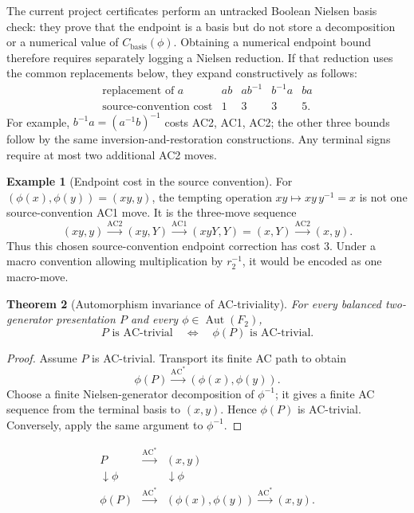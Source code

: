 \documentclass[11pt]{article}
\newtheorem{theorem}{Theorem}[section]
\theoremstyle{definition}
\newtheorem{example}[theorem]{Example}
\theoremstyle{remark}
\newcommand{\F}{F_2}
\newcommand{\Aut}{\operatorname{Aut}}
\newcommand{\AC}{\mathrm{AC}}
\begin{document}
The current project certificates perform an untracked Boolean Nielsen basis
check: they prove that the endpoint is a basis but do not store a
decomposition or a numerical value of \(C_{\mathrm{basis}}(\phi)\).
Obtaining a numerical endpoint bound therefore requires separately logging
a Nielsen reduction.  If that reduction uses the common replacements below,
they expand constructively as follows:
\[
\begin{array}{c|cccc}
\text{replacement of }a&
a b&a b^{-1}&b^{-1}a&b a\\
\hline
\text{source-convention cost}&1&3&3&5.
\end{array}
\]
For example, \(b^{-1}a=(a^{-1}b)^{-1}\) costs AC2, AC1, AC2; the other
three bounds follow by the same inversion-and-restoration constructions.
Any terminal signs require at most two additional AC2 moves.

\begin{example}[Endpoint cost in the source convention]
For \((\phi(x),\phi(y))=(xy,y)\), the tempting operation
\(xy\mapsto xy\,y^{-1}=x\) is not one source-convention AC1 move.  It is
the three-move sequence
\[
(xy,y)\xrightarrow{\AC2}(xy,Y)
\xrightarrow{\AC1}(xyY,Y)=(x,Y)
\xrightarrow{\AC2}(x,y).
\]
Thus this chosen source-convention endpoint correction has cost \(3\).
Under a macro convention allowing multiplication by \(r_2^{-1}\), it would
be encoded as one macro-move.
\end{example}

\begin{theorem}[Automorphism invariance of AC-triviality]
\label{thm:main-invariance}
For every balanced two-generator presentation \(P\) and every
\(\phi\in\Aut(\F)\),
\[
  P\text{ is AC-trivial}
  \quad\Longleftrightarrow\quad
  \phi(P)\text{ is AC-trivial}.
\]
\end{theorem}

\begin{proof}
Assume \(P\) is AC-trivial.  Transport its finite AC path to obtain
\[
  \phi(P)\xrightarrow{\AC^*}(\phi(x),\phi(y)).
\]
Choose a finite Nielsen-generator decomposition of \(\phi^{-1}\); it gives
a finite AC sequence from the terminal basis to \((x,y)\).  Hence
\(\phi(P)\) is AC-trivial.  Conversely, apply the same argument to
\(\phi^{-1}\).
\end{proof}

\[
\begin{array}{ccc}
P&\xrightarrow{\AC^*}&(x,y)\\
\downarrow\phi&&\downarrow\phi\\
\phi(P)&\xrightarrow{\AC^*}&(\phi(x),\phi(y))
\xrightarrow{\AC^*}(x,y).
\end{array}
\]
\end{document}
